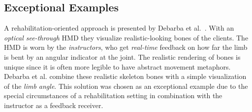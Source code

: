 \subsection{Exceptional Examples}
A rehabilitation-oriented approach is presented by Debarba et al.~\cite{debarba2018arv}. With an \emph{optical see-through} HMD they visualize realistic-looking bones of the clients. The HMD is worn by the \emph{instructors}, who get \emph{real-time} feedback on how far the limb is bent by an angular indicator at the joint. The realistic rendering of bones is unique since it is often more legible to have abstract movement metaphors. Debarba et al. combine these realistic skeleton bones with a simple visualization of the \emph{limb angle}. This solution was chosen as an exceptional example due to the special circumstances of a rehabilitation setting in combination with the instructor as a feedback receiver.


